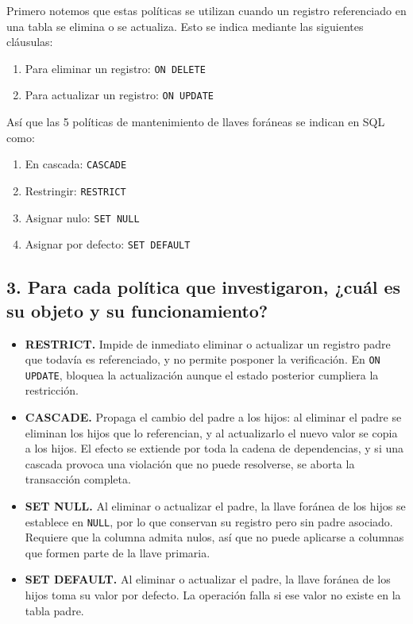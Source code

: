 \documentclass[12pt]{article}
\begin{document}
Primero notemos que estas políticas se utilizan cuando un registro referenciado en una tabla se elimina o se actualiza. Esto se indica mediante las siguientes cláusulas:
\begin{enumerate}
    \item Para eliminar un registro: \texttt{ON DELETE}
    \item Para actualizar un registro: \texttt{ON UPDATE}
\end{enumerate}

Así que las 5 políticas de mantenimiento de llaves foráneas se indican en SQL como:
\begin{enumerate}
    \item En cascada: \texttt{CASCADE}
    \item Restringir: \texttt{RESTRICT}
    \item Asignar nulo: \texttt{SET NULL}
    \item Asignar por defecto: \texttt{SET DEFAULT}
\end{enumerate}

\subsection*{3. Para cada política que investigaron, ¿cuál es su objeto y su funcionamiento?}
 
\begin{itemize}
    \item \textbf{RESTRICT.} Impide de inmediato eliminar o actualizar un registro padre que todavía es referenciado, y no permite posponer la verificación. En \texttt{ON UPDATE}, bloquea la actualización aunque el estado posterior cumpliera la restricción.
    \item \textbf{CASCADE.} Propaga el cambio del padre a los hijos: al eliminar el padre se eliminan los hijos que lo referencian, y al actualizarlo el nuevo valor se copia a los hijos. El efecto se extiende por toda la cadena de dependencias, y si una cascada provoca una violación que no puede resolverse, se aborta la transacción completa.
    \item \textbf{SET NULL.} Al eliminar o actualizar el padre, la llave foránea de los hijos se establece en \texttt{NULL}, por lo que conservan su registro pero sin padre asociado. Requiere que la columna admita nulos, así que no puede aplicarse a columnas que formen parte de la llave primaria.
    \item \textbf{SET DEFAULT.} Al eliminar o actualizar el padre, la llave foránea de los hijos toma su valor por defecto. La operación falla si ese valor no existe en la tabla padre.
\end{itemize}
\end{document}
